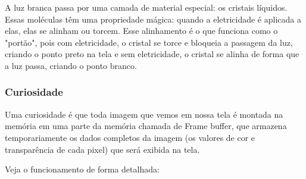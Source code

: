 \documentclass[12pt,a4paper]{report}
\begin{document}
	A luz branca passa por uma camada de material especial: os cristais líquidos. Essas moléculas têm uma propriedade mágica: quando a eletricidade é aplicada a elas, elas se alinham ou torcem. Esse alinhamento é o que funciona como o "portão", pois com eletricidade, o cristal se torce e bloqueia a passagem da luz, criando o ponto preto na tela e sem eletricidade, o cristal se alinha de forma que a luz passa, criando o ponto branco.
	
	
	\subsubsection{Curiosidade}
	
	Uma curiosidade é que toda imagem que vemos em nossa tela é montada na memória em uma parte da memória chamada de Frame buffer, que armazena temporariamente os dados completos da imagem (os valores de cor e transparência de cada pixel) que será exibida na tela.
	
	Veja o funcionamento de forma detalhada:
	
\end{document}
